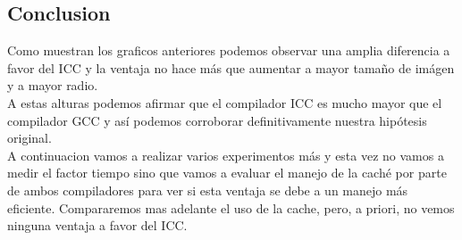 \subsection{Conclusion}
Como muestran los graficos anteriores podemos observar una amplia diferencia a favor del ICC y la ventaja no hace más que aumentar a mayor tamaño de imágen y a mayor radio.\\
A estas alturas podemos afirmar que el compilador ICC es mucho mayor que el compilador GCC y así podemos corroborar definitivamente nuestra hipótesis original.\\
A continuacion vamos a realizar varios experimentos más y esta vez no vamos a medir el factor tiempo sino que vamos a evaluar el manejo de la caché por parte de ambos compiladores para ver si esta ventaja se debe a un manejo más eficiente.
Compararemos mas adelante el uso de la cache, pero, a priori, no vemos ninguna ventaja a favor del ICC.
